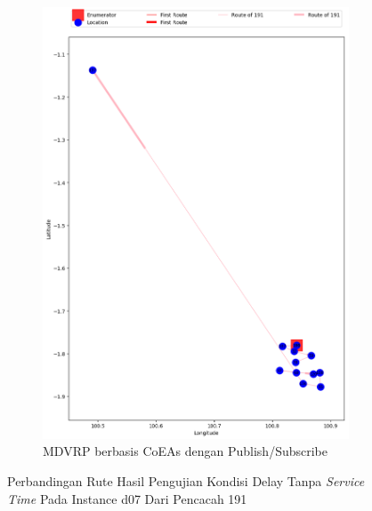 \begin{figure}[H]\ContinuedFloat
	\centering
	\begin{subfigure}[t]{\textwidth}
		\centering
		\includegraphics[width=\textwidth]{Resources/Images/delayed_7/real_m15_n100_delayed_7_191_pubsub_coes}
		\caption{MDVRP berbasis CoEAs dengan Publish/Subscribe}
		\label{fig:real_m15_n100_delayed_7_191_pubsub_coes}
	\end{subfigure}
	\caption{Perbandingan Rute Hasil Pengujian Kondisi Delay Tanpa \textit{Service Time} Pada Instance d07 Dari Pencacah 191}
	\label{fig:real_m15_n100_delayed_7_191_contd}
\end{figure}


